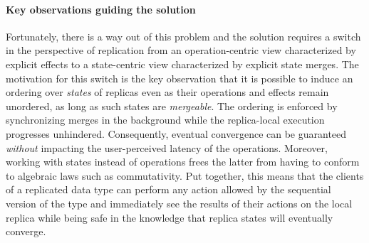 \noindent\paragraph{Key observations guiding the solution}
Fortunately, there is a way out of this problem and the solution
requires a switch in the perspective of replication from an
operation-centric view characterized by explicit effects to a
state-centric view characterized by explicit state merges. The
motivation for this switch is the key observation that it is possible
to induce an ordering over \emph{states} of replicas even as their
operations and effects remain unordered, as long as such states are
\emph{mergeable}. The ordering is enforced by synchronizing merges in
the background while the replica-local execution progresses
unhindered. Consequently, eventual convergence can be guaranteed
\emph{without} impacting the user-perceived latency of the operations.
Moreover, working with states instead of operations frees the latter
from having to conform to algebraic laws such as commutativity.  Put
together, this means that the clients of a replicated data type can
perform any action allowed by the sequential version of the type and
immediately see the results of their actions on the local replica
while being safe in the knowledge that replica states will eventually
converge.


